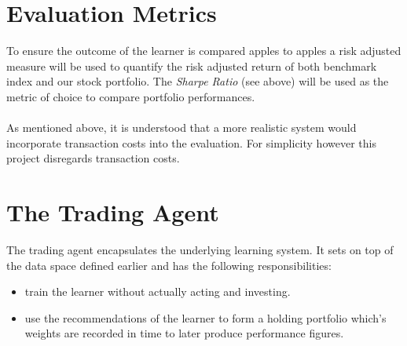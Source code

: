 \documentclass[dvips,12pt]{article}
\begin{document}
\section{Evaluation Metrics}
To ensure the outcome of the learner is compared apples to apples a risk adjusted measure will be used to quantify the risk adjusted return of both benchmark index and our stock portfolio. The \emph{Sharpe Ratio} (see above) will be used as the metric of choice to compare portfolio performances.
\\\\
As mentioned above, it is understood that a more realistic system would incorporate transaction costs into the evaluation. For simplicity however this project disregards transaction costs.

\section{The Trading Agent}
The trading agent encapsulates the underlying learning system. It sets on top of the data space defined earlier and has the following responsibilities:

\begin{itemize}
\item train the learner without actually acting and investing.
\item use the recommendations of the learner to form a holding portfolio which's weights are recorded in time to later produce performance figures.
\end{itemize}
\end{document}
